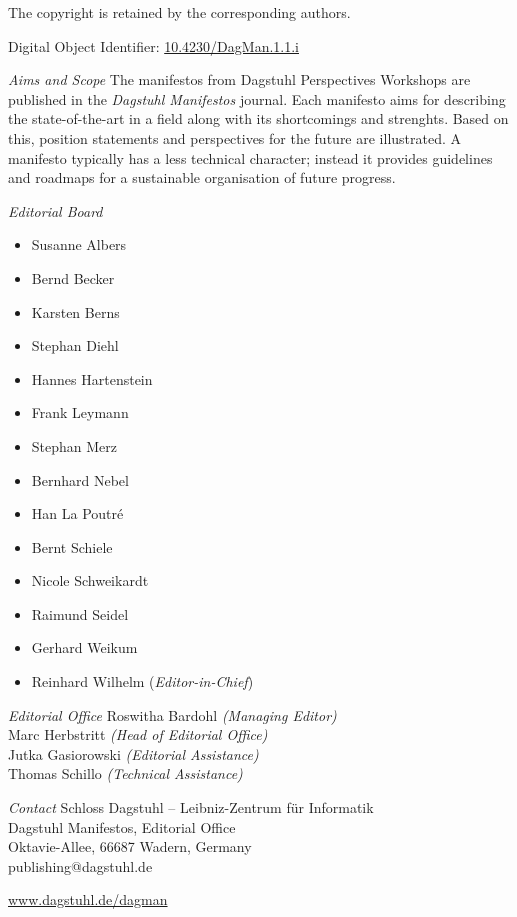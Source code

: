 \documentclass[a4paper,UKenglish]{dagman-master}
\begin{document}
\begin{publicationinfo}
\smallskip

The copyright is retained by the corresponding authors.

\vfill

Digital Object Identifier: \href{http://dx.doi.org/10.4230/DagMan.1.1.i}{10.4230/DagMan.1.1.i}

\newpage


\bigskip
\bigskip


\emph{Aims and Scope}\newline
The manifestos from Dagstuhl Perspectives Workshops are published in the \emph{Dagstuhl Manifestos} journal. Each manifesto aims for describing the state-of-the-art in a field along with its shortcomings and strenghts. Based on this, position statements and perspectives for the future are illustrated. A manifesto typically has a less technical character; instead it provides guidelines and roadmaps for a sustainable organisation of future progress. 

 
\bigskip
\bigskip
\emph{Editorial Board}
\begin{itemize}
\item Susanne Albers
\item Bernd Becker
\item Karsten Berns
\item Stephan Diehl
\item Hannes Hartenstein
\item Frank Leymann
\item Stephan Merz
\item Bernhard Nebel
\item Han La Poutr\'{e}
\item Bernt Schiele
\item Nicole Schweikardt
\item Raimund Seidel
\item Gerhard Weikum
\item Reinhard Wilhelm (\emph{Editor-in-Chief})
\end{itemize}

\bigskip
\emph{Editorial Office}\newline
Roswitha Bardohl \emph{(Managing Editor)}\\
Marc Herbstritt \emph{(Head of Editorial Office)}\\
Jutka Gasiorowski \emph{(Editorial Assistance)}\\
Thomas Schillo \emph{(Technical Assistance)}

\bigskip
\emph{Contact}\newline
Schloss Dagstuhl -- Leibniz-Zentrum f\"ur Informatik\\
Dagstuhl Manifestos, Editorial Office\\
Oktavie-Allee, 66687 Wadern, Germany\\ 
publishing@dagstuhl.de


\vfill

\href{http://www.dagstuhl.de/dagman}{www.dagstuhl.de/dagman}

  
\end{publicationinfo}
\end{document}
